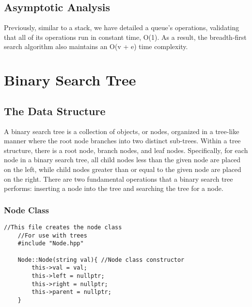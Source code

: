 \documentclass[letterpaper, 10pt,DIV=13]{scrartcl}
\numberwithin{equation}{section} %
\numberwithin{figure}{section} %
\numberwithin{table}{section} %
\begin{document}
\subsection{Asymptotic Analysis}
Previously, similar to a stack, we have detailed a queue's operations, validating that all of its operations run in constant time, O(1). As a result, the breadth-first search algorithm also maintains an O(v + e) time complexity. 


\pagebreak


\section{Binary Search Tree}

\subsection{The Data Structure}
A binary search tree is a collection of objects, or nodes, organized in a tree-like manner where the root node branches into two distinct sub-trees. Within a tree structure, there is a root node, branch nodes, and leaf nodes. Specifically, for each node in a binary search tree, all child nodes less than the given node are placed on the left, while child nodes greater than or equal to the given node are placed on the right. There are two fundamental operations that a binary search tree performs: inserting a node into the tree and searching the tree for a node.

\subsubsection*{Node Class}
    \lstset{numbers=left, numberstyle=\tiny, stepnumber=1, numbersep=5pt, basicstyle=\footnotesize\ttfamily}
    \begin{lstlisting}[frame=single, ]
   //This file creates the node class
    //For use with trees
    #include "Node.hpp"
    
    Node::Node(string val){ //Node class constructor
        this->val = val;
        this->left = nullptr;
        this->right = nullptr;
        this->parent = nullptr;
    }

\end{lstlisting}
\end{document}
